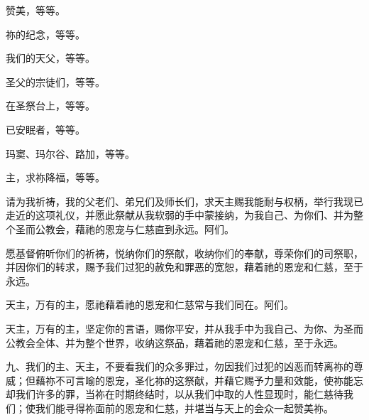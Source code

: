 赞美，等等。\par

祢的纪念，等等。\par

我们的天父，等等。\par

圣父的宗徒们，等等。\par

在圣祭台上，等等。\par

已安眠者，等等。\par

玛窦、玛尔谷、路加，等等。\par

\par

\par

主，求祢降福，等等。\par

请为我祈祷，我的父老们、弟兄们及师长们，求天主赐我能耐与权柄，举行我现已走近的这项礼仪，并愿此祭献从我软弱的手中蒙接纳，为我自己、为你们、并为整个圣而公教会，藉祂的恩宠与仁慈直到永远。阿们。\par

\par

愿基督俯听你们的祈祷，悦纳你们的祭献，收纳你们的奉献，尊荣你们的司祭职，并因你们的转求，赐予我们过犯的赦免和罪恶的宽恕，藉着祂的恩宠和仁慈，至于永远。\par

\par

天主，万有的主，愿祂藉着祂的恩宠和仁慈常与我们同在。阿们。\par

\par

天主，万有的主，坚定你的言语，赐你平安，并从我手中为我自己、为你、为圣而公教会全体、并为整个世界，收纳这祭品，藉着祂的恩宠和仁慈，至于永远。\par

\par

九、我们的主、天主，不要看我们的众多罪过，勿因我们过犯的凶恶而转离祢的尊威；但藉祢不可言喻的恩宠，圣化祢的这祭献，并藉它赐予力量和效能，使祢能忘却我们许多的罪，当祢在时期终结时，以从我们中取的人性显现时，能仁慈待我们；使我们能寻得祢面前的恩宠和仁慈，并堪当与天上的会众一起赞美祢。\par

